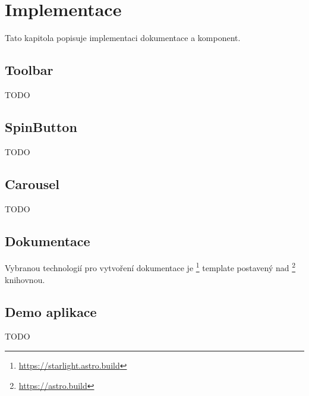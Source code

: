 \chapter{Implementace}

Tato kapitola popisuje implementaci dokumentace a komponent.

\section{Toolbar}

TODO

\section{SpinButton}

TODO

\section{Carousel}

TODO

\section{Dokumentace}

Vybranou technologií pro vytvoření dokumentace je \footnote{\url{https://starlight.astro.build}} template postavený nad \footnote{\url{https://astro.build}} knihovnou.

\section{Demo aplikace}

TODO
